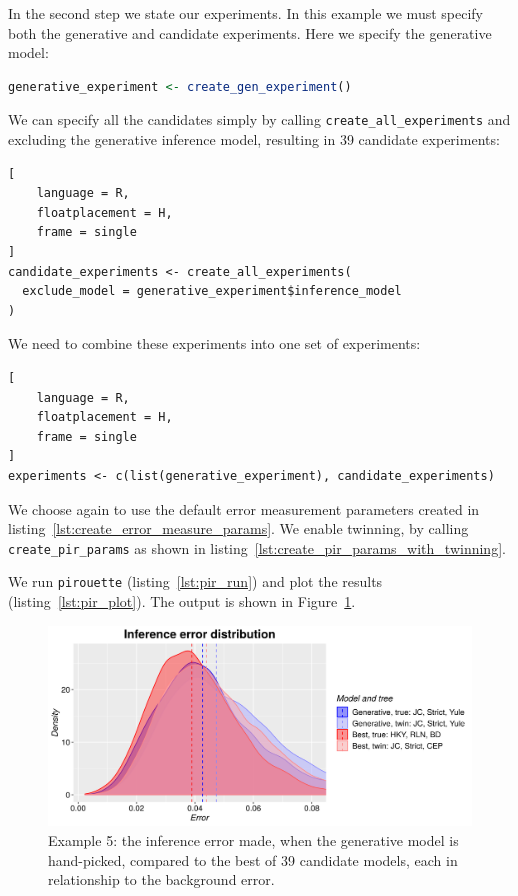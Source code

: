 In the second step we state our experiments. 
In this example we must specify both the generative and candidate experiments. 
Here we specify the generative model:

\begin{lstlisting}[language=R, floatplacement=H, frame=single]
generative_experiment <- create_gen_experiment()
\end{lstlisting}

We can specify all the candidates simply by calling 
\verb;create_all_experiments; and excluding the generative inference model,
resulting in 39 candidate experiments:

\begin{lstlisting}[
    language = R,
    floatplacement = H,
    frame = single
]
candidate_experiments <- create_all_experiments(
  exclude_model = generative_experiment$inference_model
)
\end{lstlisting}

We need to combine these experiments into one set of experiments:

\begin{lstlisting}[
    language = R,
    floatplacement = H,
    frame = single
]
experiments <- c(list(generative_experiment), candidate_experiments)
\end{lstlisting}

We choose again to use the default error measurement parameters
created in listing~\ref{lst:create_error_measure_params}.
We enable twinning, by calling \verb;create_pir_params;
as shown in listing~\ref{lst:create_pir_params_with_twinning}.

We run \verb;pirouette; (listing~\ref{lst:pir_run}) 
and plot the results (listing~\ref{lst:pir_plot}).
The output is shown in Figure~\ref{fig:example_5}.

\begin{figure}[H]
  \includegraphics[width=\textwidth]{example_5/errors.png}
  \caption{
    Example 5: the inference error made, 
    when the generative model is hand-picked, 
    compared to the best of 39 candidate models, 
    each in relationship to the background error.
  }
  \label{fig:example_5}
\end{figure}

